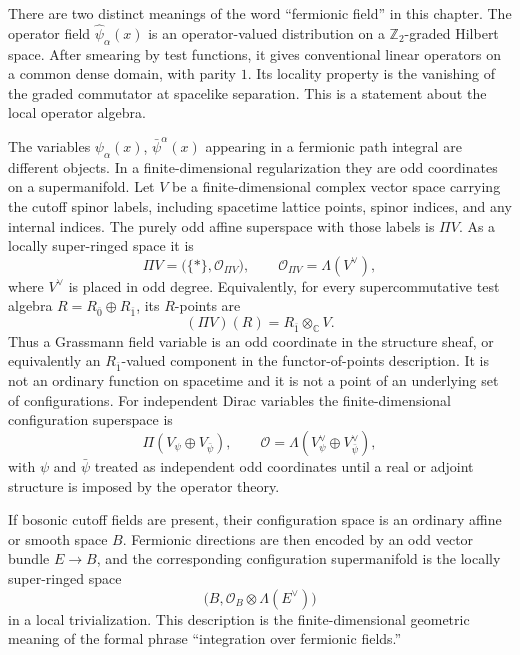 \begin{definition}
\label{def:finite-fermionic-configuration-superspace}
There are two distinct meanings of the word ``fermionic field'' in this
chapter. The operator field \(\widehat\psi_\alpha(x)\) is an
operator-valued distribution on a \(\mathbb Z_2\)-graded Hilbert space. After
smearing by test functions, it gives conventional linear operators on a
common dense domain, with parity \(1\). Its locality property is the
vanishing of the graded commutator at spacelike separation. This is a
statement about the local operator algebra.

The variables \(\psi_\alpha(x)\), \(\bar\psi^\alpha(x)\) appearing in a
fermionic path integral are different objects. In a finite-dimensional
regularization they are odd coordinates on a supermanifold. Let \(V\) be a
finite-dimensional complex vector space carrying the cutoff spinor labels,
including spacetime lattice points, spinor indices, and any internal indices.
The purely odd affine superspace with those labels is \(\Pi V\). As a
locally super-ringed space it is
\[
  \Pi V=\bigl(\{\ast\},\mathcal O_{\Pi V}\bigr),
  \qquad
  \mathcal O_{\Pi V}=\Lambda(V^\vee),
\]
where \(V^\vee\) is placed in odd degree. Equivalently, for every
supercommutative test algebra
\(R=R_{\overline{0}}\oplus R_{\overline{1}}\), its
\(R\)-points are
\[
  (\Pi V)(R)=R_{\overline{1}}\otimes_{\mathbb C} V .
\]
Thus a Grassmann field variable is an odd coordinate in the structure sheaf,
or equivalently an \(R_{\overline{1}}\)-valued component in the
functor-of-points description. It is not an ordinary function on spacetime
and it is not a point of an underlying set of configurations. For independent
Dirac variables the finite-dimensional configuration superspace is
\[
  \Pi(V_\psi\oplus V_{\bar\psi}),
  \qquad
  \mathcal O=\Lambda(V_\psi^\vee\oplus V_{\bar\psi}^\vee),
\]
with \(\psi\) and \(\bar\psi\) treated as independent odd coordinates until a
real or adjoint structure is imposed by the operator theory.

If bosonic cutoff fields are present, their configuration space is an
ordinary affine or smooth space \(B\). Fermionic directions are then encoded
by an odd vector bundle \(E\to B\), and the corresponding configuration
supermanifold is the locally super-ringed space
\[
  \bigl(B,\mathcal O_B\otimes \Lambda(E^\vee)\bigr)
\]
in a local trivialization. This description is the finite-dimensional
geometric meaning of the formal phrase ``integration over fermionic
fields.''
\end{definition}


